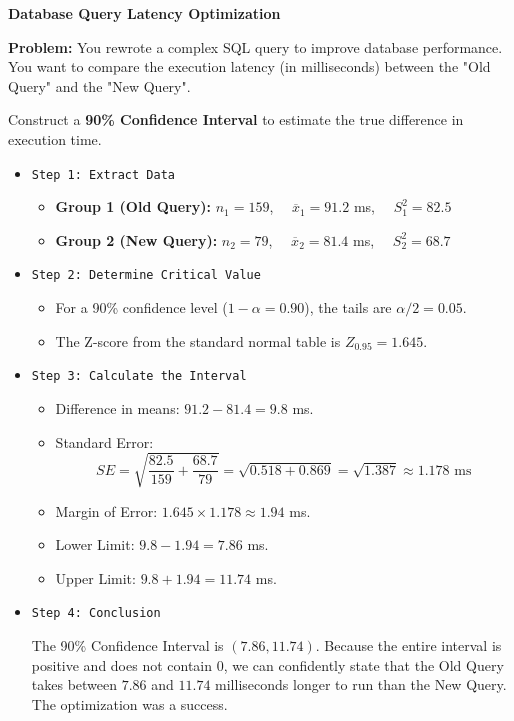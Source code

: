 \begin{example}{\textbf{Database Query Latency Optimization}}

\textbf{Problem:} You rewrote a complex SQL query to improve database performance. You want to compare the execution latency (in milliseconds) between the "Old Query" and the "New Query". 

Construct a \textbf{90\% Confidence Interval} to estimate the true difference in execution time.

\begin{itemize}
    \item \texttt{Step 1: Extract Data} 
    \begin{itemize}
        \item \textbf{Group 1 (Old Query):} $n_1 = 159$, $\quad \overline{x}_1 = 91.2$ ms, $\quad S_1^2 = 82.5$
        \item \textbf{Group 2 (New Query):} $n_2 = 79$, $\quad \overline{x}_2 = 81.4$ ms, $\quad S_2^2 = 68.7$
    \end{itemize}

    \item \texttt{Step 2: Determine Critical Value}
    \begin{itemize}
        \item For a 90\% confidence level ($1-\alpha = 0.90$), the tails are $\alpha/2 = 0.05$.
        \item The Z-score from the standard normal table is $Z_{0.95} = 1.645$.
    \end{itemize}

    \item \texttt{Step 3: Calculate the Interval}
    \begin{itemize}
        \item Difference in means: $91.2 - 81.4 = 9.8$ ms.
        \item Standard Error:
        $$ SE = \sqrt{\frac{82.5}{159} + \frac{68.7}{79}} = \sqrt{0.518 + 0.869} = \sqrt{1.387} \approx 1.178 \text{ ms} $$
        \item Margin of Error: $1.645 \times 1.178 \approx 1.94$ ms.
        \item Lower Limit: $9.8 - 1.94 = 7.86$ ms.
        \item Upper Limit: $9.8 + 1.94 = 11.74$ ms.
    \end{itemize}

    \item \texttt{Step 4: Conclusion} 
    
    The 90\% Confidence Interval is $\boxed{(7.86, 11.74)}$. 
    Because the entire interval is positive and does not contain $0$, we can confidently state that the Old Query takes between $7.86$ and $11.74$ milliseconds longer to run than the New Query. The optimization was a success.
\end{itemize}
\end{example}

